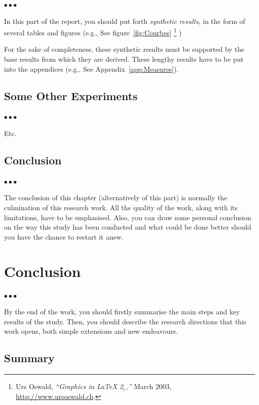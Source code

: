 \documentclass[11pt, english, screen, research-development]{report-rd-info}
\newenvironment{explanation}
{\color{blue}
 \begin{list}{}{\hspace{0.2\textwidth}\color{blue}}\item $\bullet\bullet\bullet$
}
{\end{list}}
\begin{document}
\begin{explanation}
   In this part of the report, you should put forth \emph{synthetic results}, in the form of several tables and figures (e.g., See figure~\ref{fig:Courbes}%
   \footnote{Urs Oswald, \emph{``Graphics in LaTeX 2$_\varepsilon$,''} March 2003, \url{http://www.ursoswald.ch}.}%
   )

   For the sake of completeness, these synthetic results must be supported by the base results from which they are derived.
   These lengthy results have to be put into the appendices (e.g., See Appendix~\ref{app:Measures}).
\end{explanation}

\section{Some Other Experiments}

\begin{explanation}
   Etc.
\end{explanation}

\section{Conclusion}

\begin{explanation}
   The conclusion of this chapter (alternatively of this part) is normally the culmination of this research work.
   All the quality of the work, along with its limitations, have to be emphasised.
   Also, you can draw some personal conclusion on the way this study has been conducted and what could be done better should you have the chance to restart it anew.
\end{explanation}


\chapter{Conclusion}

\begin{explanation}
   By the end of the work, you should firstly summarise the main steps and key results of the study.
   Then, you should describe the research directions that this work opens, both simple extensions and new endeavours.
\end{explanation}

\section{Summary}
\end{document}
